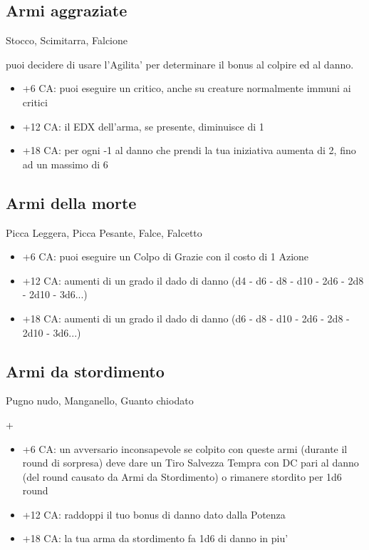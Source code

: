 \documentclass[a4paper,11pt,twoside,openany]{book}
\begin{document}
\subsection{Armi aggraziate} Stocco, Scimitarra, Falcione

puoi decidere di usare l'Agilita' per determinare il bonus al colpire
ed al danno.

\begin{itemize}
	\item +6 CA: puoi eseguire un critico, anche su creature normalmente immuni
ai critici

\item +12 CA: il EDX dell'arma, se presente, diminuisce di 1

\item +18 CA: per ogni -1 al danno che prendi la tua iniziativa aumenta di 2, fino ad un massimo di 6
\end{itemize}

\subsection{Armi della morte} Picca Leggera, Picca Pesante, Falce, Falcetto

\begin{itemize}
	\item +6 CA: puoi eseguire un Colpo di Grazie con il costo di 1 Azione

\item +12 CA: aumenti di un grado il dado di danno (d4 - d6 - d8 - d10 - 2d6 - 2d8 - 2d10 - 3d6...)

\item +18 CA: aumenti di un grado il dado di danno (d6 - d8 - d10 - 2d6 - 2d8 - 2d10 - 3d6...)

\end{itemize}

\subsection{Armi da stordimento} Pugno nudo, Manganello, Guanto chiodato

+\begin{itemize}
\item +6 CA: un avversario inconsapevole se colpito con queste armi (durante il round di sorpresa) deve dare un Tiro Salvezza Tempra con DC pari al danno (del round causato da Armi da Stordimento) o rimanere stordito per 1d6 round

\item +12 CA: raddoppi il tuo bonus di danno dato dalla Potenza

\item +18 CA: la tua arma da stordimento fa 1d6 di danno in piu'
\end{itemize}
\end{document}
